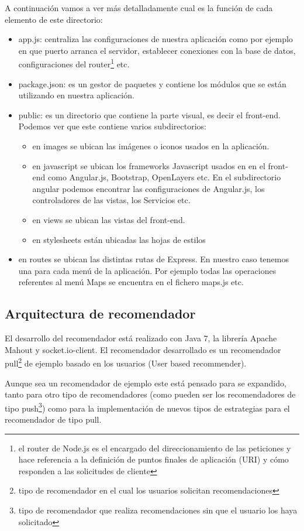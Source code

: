 A continuación vamos a ver más detalladamente cual es la función de cada elemento de este directorio:
\begin{itemize}
	\item app.js: centraliza las configuraciones de nuestra aplicación como por ejemplo en que puerto arranca el servidor, establecer conexiones con la base de datos, configuraciones del router\footnote{el router de Node.js es el encargado del direccionamiento de las peticiones y hace referencia a la definición de puntos finales de aplicación (URI) y cómo responden a las solicitudes de cliente} etc.
	\item package.json: es un gestor de paquetes y contiene los módulos que se están utilizando en nuestra aplicación.
	\item public: es un directorio que contiene la parte visual, es decir el front-end. Podemos ver que este contiene varios subdirectorios:
	\begin{itemize}
	\item en images se ubican las imágenes o iconos usados en la aplicación.
	\item en javascript se ubican los frameworks Javascript usados en en el front-end como Angular.js, Bootstrap, OpenLayers etc. En el subdirectorio angular podemos encontrar las configuraciones de Angular.js, los controladores de las vistas, los Servicios etc.
	\item en views se ubican las vistas del front-end.
	\item en stylesheets están ubicadas las hojas de estilos
	\end{itemize}
	\item en routes se ubican las distintas rutas de Express. En nuestro caso tenemos una para cada menú de la aplicación. Por ejemplo todas las operaciones referentes al menú Maps se encuentra en el fichero maps.js etc.
\end{itemize}

\subsection{Arquitectura de recomendador}

El desarrollo del recomendador está realizado con Java 7, la librería Apache Mahout y socket.io-client. El recomendador desarrollado es un recomendador pull\footnote{tipo de recomendador en el cual los usuarios solicitan recomendaciones} de ejemplo basado en los usuarios (User based recommender). 

Aunque sea un recomendador de ejemplo este está pensado para se expandido, tanto para otro tipo de recomendadores (como pueden ser los recomendadores de tipo push\footnote{tipo de recomendador que realiza recomendaciones sin que el usuario los haya solicitado}) como para la implementación de nuevos tipos de estrategias para el recomendador de tipo pull.

